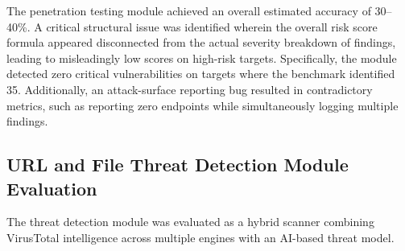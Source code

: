 \documentclass[12pt, a4paper]{article}
\begin{document}
\begin{table}[H]
\centering
\caption{Pentest Test 2 --- Target: brokencrystals.zerothreat.ai (API scope)}
\label{tab:pt_test2}
\small
\renewcommand{\arraystretch}{1.3}
\end{table}

The penetration testing module achieved an overall estimated accuracy of 30--40\%. A critical structural issue was identified wherein the overall risk score formula appeared disconnected from the actual severity breakdown of findings, leading to misleadingly low scores on high-risk targets. Specifically, the module detected zero critical vulnerabilities on targets where the benchmark identified 35. Additionally, an attack-surface reporting bug resulted in contradictory metrics, such as reporting zero endpoints while simultaneously logging multiple findings.

\subsection{URL and File Threat Detection Module Evaluation}

The threat detection module was evaluated as a hybrid scanner combining VirusTotal intelligence across multiple engines with an AI-based threat model.
\end{document}
